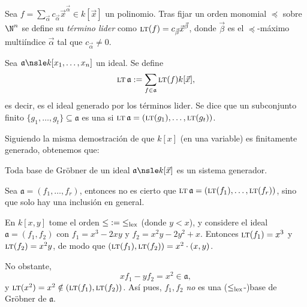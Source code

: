 \documentclass[11pt, reqno]{amsart}
\DeclareMathOperator{\LT}{\text{\textsc{lt}}}
\begin{document}
\begin{mydef}
	Sea $f = \sum_{\vec\alpha} c_{\vec\alpha} \vec x^{\vec\alpha} \in k[\vec x]$ un polinomio.
	Tras fijar un orden monomial $\preceq$ sobre $\N^n$ se define su \emph{término lider} como $\LT(f) = c_{\vec\beta} \vec
	x^{\vec\beta}$, donde $\vec\beta$ es el $\preceq$-máximo multiíndice $\vec\alpha$ tal que $c_{\vec\alpha} \ne 0$.

	Sea $\mathfrak{a} \nsle k[x_1, \dots, x_n]$ un ideal.
	Se define
	\[
		\LT\mathfrak{a} := \sum_{f \in \mathfrak{a}} \LT(f)k[\vec x],
	\]
	es decir, es el ideal generado por los términos lider.
	Se dice que un subconjunto finito $\{ g_1, \dots, g_t \} \subseteq \mathfrak{a}$ es una  si $\LT\mathfrak{a}
	= (\LT(g_1), \dots, \LT(g_t))$.
\end{mydef}
Siguiendo la misma demostración de que $k[x]$ (en una variable) es finitamente generado, obtenemos que:
\begin{cor}
	Toda base de Gröbner de un ideal $\mathfrak{a} \nsle k[\vec x]$ es un sistema generador.
\end{cor}

\begin{obs}
	Sea $\mathfrak{a} = (f_1, \dots, f_r)$, entonces no es cierto que $\LT\mathfrak{a} = (\LT(f_1), \dots, \LT(f_r))$, sino que solo hay
	una inclusión \textquote{$\supseteq$} en general.
\end{obs}
\begin{ex}\label{ex:non-grob}
	En $k[x, y]$ tome el orden ${\leq} := {\leq_{\rm lex}}$ (donde $y < x$),
	y considere el ideal $\mathfrak{a} = (f_1, f_2)$ con $f_1 = x^3 - 2xy$ y $f_2 = x^2y - 2y^2 + x$.
	Entonces $\LT(f_1) = x^3$ y $\LT(f_2) = x^2y$, de modo que $(\LT(f_1), \LT(f_2)) = x^2\cdot (x, y)$.

	No obstante,
	\[
		x f_1 - y f_2 = x^2 \in \mathfrak{a},
	\]
	y $\LT(x^2) = x^2 \notin (\LT(f_1), \LT(f_2))$.
	Así pues, $f_1, f_2$ \emph{no} es una ($\le_{\rm lex}$-)base de Gröbner de $\mathfrak{a}$.
\end{ex}
\end{document}
